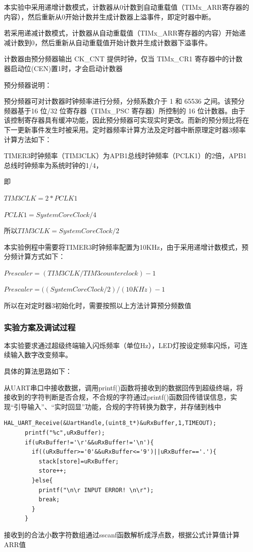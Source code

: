 ﻿\documentclass[UTF8,12pt]{article}
\begin{document}
\begin{enumerate}
    本实验中采用递增计数模式，计数器从0计数到自动重载值（TIMx\_ARR寄存器的内容），然后重新从0开始计数并生成计数器上溢事件，即定时器中断。

    若采用递减计数模式，计数器从自动重载值（TIMx\_ARR寄存器的内容）开始递减计数到0，然后重新从自动重载值开始计数并生成计数器下溢事件。

    计数器由预分频器输出 CK\_CNT 提供时钟，仅当 TIMx\_CR1 寄存器中的计数器启动位(CEN)置1时，才会启动计数器

    预分频器说明：

    预分频器可对计数器时钟频率进行分频，分频系数介于 1 和 65536 之间。该预分频器基于16 位/32 位寄存器（TIMx\_PSC 寄存器）所控制的 16 位计数器。由于该控制寄存器具有缓冲功能，因此预分频器可实现实时更改。而新的预分频比将在下一更新事件发生时被采用。定时器频率计算方法及定时器中断原理定时器3频率计算方法如下：

    TIMER3时钟频率（TIM3CLK）为APB1总线时钟频率（PCLK1）的2倍，APB1总线时钟频率为系统时钟的1/4，

    即

    $TIM3CLK = 2 * PCLK1$

    $PCLK1 = SystemCoreClock / 4$

    所以$TIM3CLK  =  SystemCoreClock / 2$

    本实验例程中需要将TIMER3时钟频率配置为10KHz，由于采用递增计数模式，预分频计算方式如下：

    $Prescaler  =  ( TIM3CLK / TIM3 counter clock ) - 1$

    $Prescaler  =  ( ( SystemCoreClock / 2 ) / ( 10KHz ) - 1$

    所以在对定时器3初始化时，需要按照以上方法计算预分频数值
\end{enumerate}

\subsubsection{实验方案及调试过程}

本实验要求通过超级终端输入闪烁频率（单位Hz），LED灯按设定频率闪烁，可连续输入数字改变频率。

具体的算法思路如下：

从UART串口中接收数据，调用printf()函数将接收到的数据回传到超级终端，将接收到的字符判断是否合规，不合规的字符通过printf()函数回传错误信息，实现“引导输入”、“实时回显”功能，合规的字符转换为数字，并存储到栈中

\begin{lstlisting}[frame=shadowbox]
HAL_UART_Receive(&UartHandle,(uint8_t*)&uRxBuffer,1,TIMEOUT);
      printf("%c",uRxBuffer);
      if(uRxBuffer!='\r'&&uRxBuffer!='\n'){
        if((uRxBuffer>='0'&&uRxBuffer<='9')||uRxBuffer=='.'){
          stack[store]=uRxBuffer;
          store++;
        }else{
          printf("\n\r INPUT ERROR! \n\r");
          break;
        }
      }  
\end{lstlisting}
接收到的合法小数字符数组通过sscanf函数解析成浮点数，根据公式计算值计算ARR值
\end{document}
